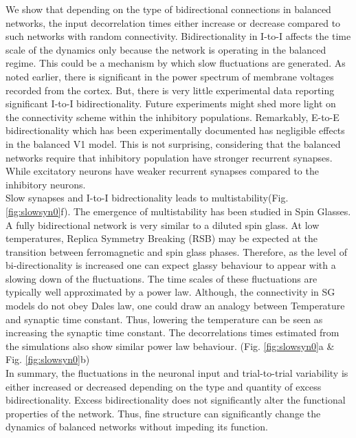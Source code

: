 We show that depending on the type of bidirectional connections in balanced networks, the input decorrelation times either increase or decrease compared to such networks with random connectivity. Bidirectionality in I-to-I affects the time scale of the dynamics only because the network is operating in the balanced regime. This could be a mechanism by which slow fluctuations are generated. As noted earlier, there is significant in the power spectrum of membrane voltages recorded from the cortex. But, there is very little experimental data reporting significant I-to-I bidirectionality. Future experiments might shed more light on the connectivity scheme within the inhibitory populations. Remarkably, E-to-E bidirectionality which has been experimentally documented has negligible effects in the balanced V1 model. This is not surprising, considering that the balanced networks require that inhibitory population have stronger recurrent synapses. While excitatory neurons have weaker recurrent synapses compared to the inhibitory neurons. \\
Slow synapses and I-to-I bidrectionality leads to multistability(Fig. \ref{fig:slowsyn0}f). The emergence of multistability has been studied in Spin Glasses. A fully bidirectional network is very similar to a diluted spin glass\cite{megard1987spin}. At low temperatures, Replica Symmetry Breaking (RSB) may be expected at the transition between ferromagnetic and spin glass phases. Therefore, as the level of bi-directionality is increased one can expect glassy behaviour to appear with a slowing down of the fluctuations\cite{Crisanti1987, Crisanti1988}. The time scales of these fluctuations are typically well approximated by a power law. Although, the connectivity in SG models do not obey Dales law, one could draw an analogy between Temperature and synaptic time constant. Thus, lowering the temperature can be seen as increasing the synaptic time constant. The decorrelations times estimated from the simulations also show similar power law behaviour. (Fig. \ref{fig:slowsyn0}a \& Fig. \ref{fig:slowsyn0}b) \\
In summary, the fluctuations in the neuronal input and trial-to-trial variability is either increased or decreased depending on the type and quantity of excess bidirectionality. Excess bidirectionality does not significantly alter the functional properties of the network. Thus, fine structure can significantly change the dynamics of balanced networks without impeding its function. 




